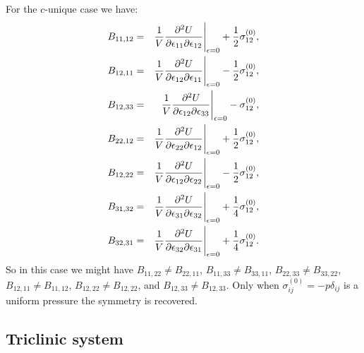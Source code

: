 \documentclass[12pt,a4paper,twoside]{report}
\begin{document}
For the $c$-unique case we have:
\begin{eqnarray}
B_{11,12} &=& {1 \over V}{\partial^2 U \over \partial \epsilon_{11}
\partial \epsilon_{12}}\Bigg|_{\epsilon=0} +{1\over 2}\sigma^{(0)}_{12}, \\
B_{12,11} &=& {1 \over V}{\partial^2 U \over \partial \epsilon_{12}
\partial \epsilon_{11}}\Bigg|_{\epsilon=0} -{1\over 2}\sigma^{(0)}_{12}, \\
B_{12,33} &=& {1 \over V}{\partial^2 U \over \partial \epsilon_{12}
\partial \epsilon_{33}}\Bigg|_{\epsilon=0} -\sigma^{(0)}_{12}, \\
B_{22,12} &=& {1 \over V}{\partial^2 U \over \partial \epsilon_{22}
\partial \epsilon_{12}}\Bigg|_{\epsilon=0} +{1\over 2}\sigma^{(0)}_{12}, \\
B_{12,22} &=& {1 \over V}{\partial^2 U \over \partial \epsilon_{12}
\partial \epsilon_{22}}\Bigg|_{\epsilon=0} -{1\over 2}\sigma^{(0)}_{12}, \\
B_{31,32} &=& {1 \over V}{\partial^2 U \over \partial \epsilon_{31}
\partial \epsilon_{32}}\Bigg|_{\epsilon=0} + {1\over 4}\sigma^{(0)}_{12}, \\
B_{32,31} &=& {1 \over V}{\partial^2 U \over \partial \epsilon_{32}
\partial \epsilon_{31}}\Bigg|_{\epsilon=0} +{1\over 4}\sigma^{(0)}_{12}. 
\end{eqnarray}
So in this case we might have $B_{11,22} \ne B_{22,11}$,
$B_{11,33} \ne B_{33,11}$, $B_{22,33} \ne B_{33,22}$,
$B_{12,11} \ne B_{11,12}$, $B_{12,22} \ne B_{12,22}$,
and $B_{12,33} \ne B_{12,33}$. Only when $\sigma^{(0)}_{ij}=
-p\delta_{ij}$ is a uniform pressure the symmetry is recovered.

{\color{web-blue}\subsection{Triclinic system}}
\color{black}
\end{document}
